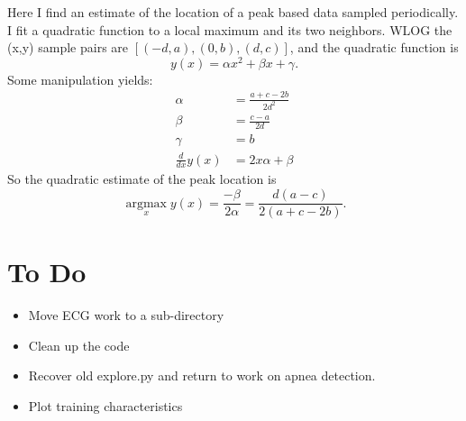 \documentclass[12pt]{article}
\newcommand{\argmax}{\operatorname*{argmax}}
\begin{document}
Here I find an estimate of the location of a peak based data sampled
periodically.  I fit a quadratic function to a local maximum and its
two neighbors.  WLOG the (x,y) sample pairs are $[(-d,a), (0,b),
(d,c)]$, and the quadratic function is
\begin{equation*}
  y(x) = \alpha x^2 + \beta x + \gamma.
\end{equation*}
Some manipulation yields:
\begin{align*}
  \alpha &= \frac{a+c-2b}{2d^2} \\
  \beta &= \frac{c-a}{2d} \\
  \gamma &= b \\
  \frac{d}{dx} y(x) &= 2x\alpha + \beta
\end{align*}
So the quadratic estimate of the peak location is
\begin{equation*}
  \argmax_x y(x) = \frac{-\beta}{2\alpha} = \frac{d(a-c)}{2(a+c-2b)}.
\end{equation*}

\section{To Do}
\label{sec:todo}

\begin{itemize}
\item Move ECG work to a sub-directory
\item Clean up the code
\item Recover old explore.py and return to work on apnea detection.
\end{itemize}

\begin{itemize}
\item Plot training characteristics
\end{itemize}
\end{document}
